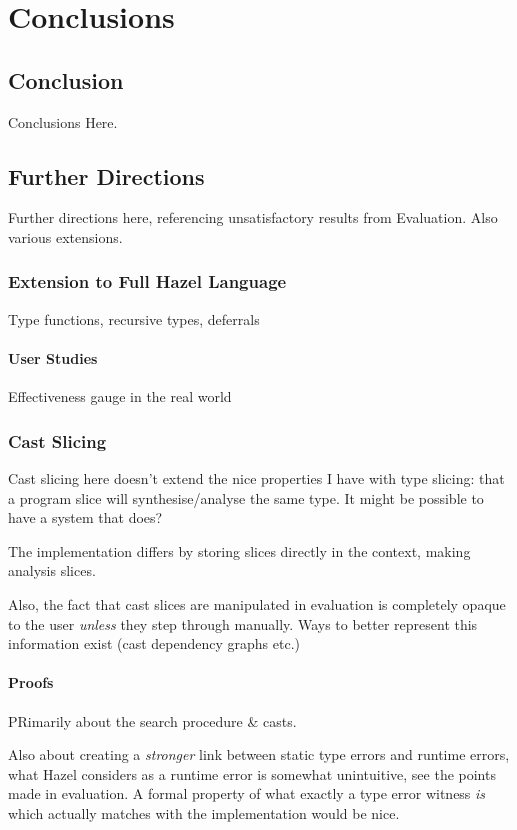 \chapter{Conclusions}\label{chap:Conclusions}

\section{Conclusion}
Conclusions Here.

\section{Further Directions}
Further directions here, referencing unsatisfactory results from Evaluation. Also various extensions.
\subsection{Extension to Full Hazel Language}
Type functions, recursive types, deferrals

\subsubsection{User Studies}
Effectiveness gauge in the real world

\subsection{Cast Slicing}
Cast slicing here doesn't extend the nice properties I have with type slicing: that a program slice will synthesise/analyse the same type. It might be possible to have a system that does?

The implementation differs by storing slices directly in the context, making analysis slices.

Also, the fact that cast slices are manipulated in evaluation is completely opaque to the user \textit{unless} they step through manually. Ways to better represent this information exist (cast dependency graphs etc.)

\subsubsection{Proofs}
PRimarily about the search procedure \& casts. 

Also about creating a \textit{stronger} link between static type errors and runtime errors, what Hazel considers as a runtime error is somewhat unintuitive, see the points made in evaluation. A formal property of what exactly a type error witness \textit{is} which actually matches with the implementation would be nice.


